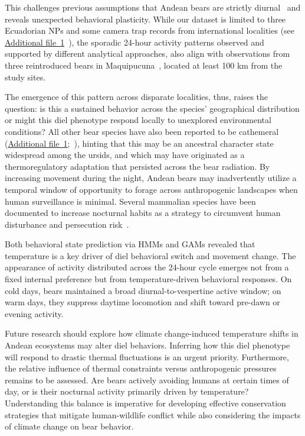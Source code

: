 \documentclass[lineno,referee,pdflatex,sn-vancouver-num]{sn-jnl}%
\theoremstyle{thmstyleone}%
\theoremstyle{thmstyletwo}%
\theoremstyle{thmstylethree}%
\begin{document}
This challenges previous assumptions that Andean bears are strictly diurnal~\cite{parra-romeroNotEatingAlone2019} and reveals unexpected behavioral plasticity.
While our dataset is limited to three Ecuadorian NPs and some camera trap records from international localities (see \hyperref[S1_File]{Additional file~1}~\cite{zotero-item-6551}), the sporadic 24-hour activity patterns observed and supported by different analytical approaches, also align with observations from three reintroduced bears in Maquipucuna~\cite{castellanosEcologiaComportamientoOsos2005}, located at least 100 km from the study sites.

The emergence of this pattern across disparate localities, thus, raises the question: is this a sustained behavior across the species' geographical distribution or might this diel phenotype respond locally to unexplored environmental conditions?
All other bear species have also been reported to be cathemeral (\hyperref[S1_File]{Additional file~1};~\cite{sibaraniUsingBycatchData2024,kawamuraDielMonthlyActivity2022,wareClockKeepsTicking2020}),
hinting that this may be an ancestral character state widespread among the ursids, and which may have originated as a thermoregulatory adaptation that persisted across the bear radiation.
By increasing movement during the night, Andean bears may inadvertently utilize a temporal window of
opportunity to forage across anthropogenic landscapes when human surveillance is minimal.
Several mammalian species have been documented to increase nocturnal habits as a strategy to circumvent human disturbance and persecution risk~\cite{gaynorInfluenceHumanDisturbance2018}.

Both behavioral state prediction via HMMs and GAMs revealed that temperature is a key driver of diel behavioral switch and movement change. The appearance of activity distributed across the 24-hour cycle emerges not from a fixed internal preference but from temperature-driven behavioral responses. On cold days, bears maintained a broad diurnal-to-vespertine active window; on warm days, they suppress daytime locomotion and shift toward pre-dawn or evening activity.

Future research should explore how climate change-induced temperature shifts in Andean ecosystems may alter diel behaviors. Inferring how this diel phenotype will respond to drastic thermal fluctuations is an urgent priority. Furthermore, the relative influence of thermal constraints versus anthropogenic pressures remains to be assessed. Are bears actively avoiding humans at certain times of day, or is their nocturnal activity primarily driven by temperature? Understanding this balance is imperative for developing effective conservation strategies that mitigate human-wildlife conflict while also considering the impacts of climate change on bear behavior.
\end{document}
